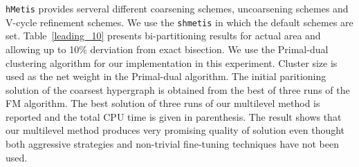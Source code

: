 \documentclass[journal]{IEEEtran}
\begin{document}

\verb+hMetis+ provides serveral different coarsening schemes, uncoarsening
schemes and V-cycle refinement schemes. We use the \verb+shmetis+
in which the default schemes are set. Table~\ref{leading_10} presents
bi-partitioning results for actual area and allowing up to 10\%
derviation from exact bisection. We use the Primal-dual clustering
algorithm for our implementation in this experiment. Cluster size
is used as the net weight in the Primal-dual algorithm. The initial
paritioning solution of the coarsest hypergraph is obtained from the
best of three runs of the FM algorithm. The best solution of three
runs of our multilevel method is reported and the total CPU time is
given in parenthesis. The result shows that our multilevel method
produces very promising quality of solution even thought both aggressive
strategies and non-trivial fine-tuning techniques have not been used.
\end{document}
